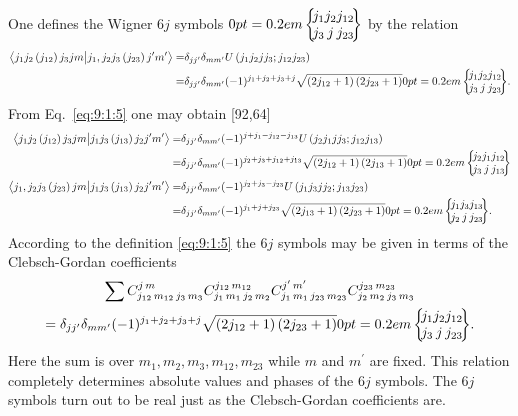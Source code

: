 One defines the Wigner $6 j$ symbols $\sixj{j_{1}}{j_{2}}{j_{12}}{j_{3}}{j}{j_{23}}$ by the relation
\begin{align}
 \braket{j_{1} j_{2}\left(j_{12}\right) j_{3} j m}{j_{1}, j_{2} j_{3}\left(j_{23}\right) j^{\prime} m^{\prime}}=&\delta_{j j^{\prime}} \delta_{m m^{\prime}} U\left(j_{1} j_{2} j j_{3} ; j_{12} j_{23}\right)  \notag\\
= & \delta_{j j^{\prime}} \delta_{m m^{\prime}}(-1)^{j_{1}+j_{2}+j_{3}+j} \sqrt{\left(2 j_{12}+1\right)\left(2 j_{23}+1\right)}\sixj{j_{1}}{j_{2}}{j_{12}}{j_{3}}{j}{j_{23}} . \label{eq:9:1:5}
\end{align}
From Eq.~\eqref{eq:9:1:5} one may obtain [92,64]
\begin{align}
\braket{j_{1} j_{2}\left(j_{12}\right) j_{3} j m}{j_{1} j_{3}\left(j_{13}\right) j_{2} j^{\prime} m^{\prime}}=&\delta_{j j^{\prime}} \delta_{m m^{\prime}}(-1)^{j+j_{1}-j_{12}-j_{13}} U\left(j_{2} j_{1} j j_{3} ; j_{12} j_{13}\right)  \notag\\
=&\delta_{j j^{\prime}} \delta_{m m^{\prime}}(-1)^{j_{2}+j_{3}+j_{12}+j_{13}} \sqrt{\left(2 j_{12}+1\right)\left(2 j_{13}+1\right)}\sixj{j_{2}}{j_{1}}{j_{12}}{j_{3}}{j}{j_{13}}  \label{eq:9:1:6}\\
\braket{j_{1}, j_{2} j_{3}\left(j_{23}\right) j m}{j_{1} j_{3}\left(j_{13}\right) j_{2} j^{\prime} m^{\prime}}=&\delta_{j j^{\prime}} \delta_{m m^{\prime}}(-1)^{j_{2}+j_{3}-j_{23}} U\left(j_{1} j_{3} j j_{2} ; j_{13} j_{23}\right)  \notag\\
=&\delta_{j j^{\prime}} \delta_{m m^{\prime}}(-1)^{j_{1}+j+j_{23}} \sqrt{\left(2 j_{13}+1\right)\left(2 j_{23}+1\right)}\sixj{j_{1}}{j_{3}}{j_{13}}{j_{2}}{j}{j_{23}} . \label{eq:9:1:7}
\end{align}
According to the definition \eqref{eq:9:1:5} the $6 j$ symbols may be given in terms of the Clebsch-Gordan coefficients
\begin{multline}
\sum \clebsch{j_{12}}{m_{12}}{j_{3}}{m_{3}}{j}{m} \clebsch{j_{1}}{m_{1}}{j_{2}}{m_{2}}{j_{12}}{m_{12}} \clebsch{j_{1}}{m_{1}}{j_{23}}{m_{23}}{j^{\prime}}{m^{\prime}} \clebsch{j_{2}}{m_{2}}{j_{3}}{m_{3}}{j_{23}}{m_{23}}  \\
=\delta_{j j^{\prime}} \delta_{m m^{\prime}}(-1)^{j_{1}+j_{2}+j_{3}+j} \sqrt{\left(2 j_{12}+1\right)\left(2 j_{23}+1\right)}\sixj{j_{1}}{j_{2}}{j_{12}}{j_{3}}{j}{j_{23}} . \label{eq:9:1:8}
\end{multline}
Here the sum is over $m_{1}, m_{2}, m_{3}, m_{12}, m_{23}$ while $m$ and $m^{\prime}$ are fixed. This relation completely determines absolute values and phases of the $6 j$ symbols. The $6 j$ symbols turn out to be real just as the Clebsch-Gordan coefficients are.

